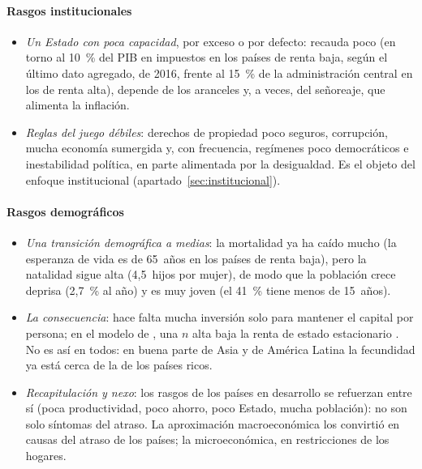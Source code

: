 \documentclass[11pt]{article}
\begin{document}
\paragraph{Rasgos institucionales}

\begin{itemize}
\item \emph{Un Estado con poca capacidad}, por exceso o por defecto: recauda poco (en torno al 10~\% del PIB en impuestos en los países de renta baja, según el último dato agregado, de 2016, frente al 15~\% de la administración central en los de renta alta), depende de los aranceles y, a veces, del señoreaje, que alimenta la inflación\nocite{BM2026WDI}.
\item \emph{Reglas del juego débiles}: derechos de propiedad poco seguros, corrupción, mucha economía sumergida y, con frecuencia, regímenes poco democráticos e inestabilidad política, en parte alimentada por la desigualdad. Es el objeto del enfoque institucional (apartado~\ref{sec:institucional}).
\end{itemize}

\paragraph{Rasgos demográficos}

\begin{itemize}
\item \emph{Una transición demográfica a medias}: la mortalidad ya ha caído mucho (la esperanza de vida es de 65~años en los países de renta baja), pero la natalidad sigue alta (4,5~hijos por mujer), de modo que la población crece deprisa (2,7~\% al año) y es muy joven (el 41~\% tiene menos de 15~años)\nocite{BM2026WDI}.
\item \emph{La consecuencia}: hace falta mucha inversión solo para mantener el capital por persona; en el modelo de , una $n$ alta baja la renta de estado estacionario . No es así en todos: en buena parte de Asia y de América Latina la fecundidad ya está cerca de la de los países ricos.
\end{itemize}

\begin{itemize}
\item \emph{Recapitulación y nexo}: los rasgos de los países en desarrollo se refuerzan entre sí (poca productividad, poco ahorro, poco Estado, mucha población): no son solo síntomas del atraso. La aproximación macroeconómica los convirtió en causas del atraso de los países; la microeconómica, en restricciones de los hogares.
\end{itemize}
\end{document}
